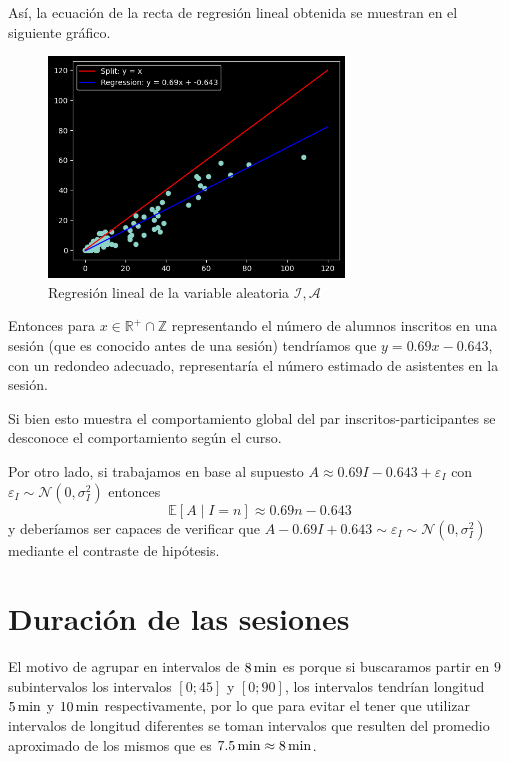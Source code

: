 \documentclass[11pt,a4paper]{book}
\theoremstyle{definition}%
\newcommand{\Real}{\mathbb{R}}
\newcommand{\Integer}{\mathbb{Z}}
\newcommand{\EV}[1]{\mathbb{E}\left[#1\right]}
\begin{document}
                Así, la ecuación de la recta de regresión lineal obtenida se muestran en el siguiente gráfico.
                \begin{figure}[H]
                    \centering
                    \includegraphics[width=0.7\textwidth]{Sources/linearregression_InscritosParticipantes.png}
                    \caption{Regresión lineal de la variable aleatoria $\mathcal{I},\mathcal{A}$}
                    \label{fig:linearregression_InscritosParticipantes}
                \end{figure}
                Entonces para $x\in\Real^+\cap\Integer$ representando el número de alumnos inscritos en una sesión (que es conocido antes de una sesión) tendríamos que $y=0.69x-0.643$, con un redondeo adecuado, representaría el número estimado de asistentes en la sesión.

                Si bien esto muestra el comportamiento global del par inscritos-participantes se desconoce el comportamiento según el curso.

                Por otro lado, si trabajamos en base al supuesto $A\approx0.69I-0.643+\varepsilon_I$ con $\varepsilon_I\sim\mathcal{N}(0,\sigma_I^2)$ entonces
                \begin{equation*}
                    \EV{A\mid I=n}\approx 0.69n-0.643
                \end{equation*}
                y deberíamos ser capaces de verificar que $A-0.69I+0.643\sim\varepsilon_I\sim\mathcal{N}(0,\sigma_I^2)$ mediante el contraste de hipótesis.
        \section{Duración de las sesiones}
            El motivo de agrupar en intervalos de $8\,\textup{min}$ es porque si buscaramos partir en $9$ subintervalos los intervalos $[0;45]$ y $[0;90]$, los intervalos tendrían longitud $5\,\textup{min}$ y $10\,\textup{min}$ respectivamente, por lo que para evitar el tener que utilizar intervalos de longitud diferentes se toman intervalos que resulten del promedio aproximado de los mismos que es $7.5\,\textup{min}\approx8\,\textup{min}$.
\end{document}
